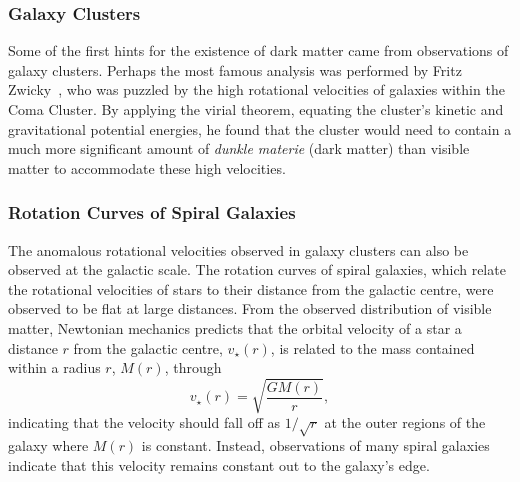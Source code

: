 \subsubsection*{Galaxy Clusters}

Some of the first hints for the existence of dark matter came from observations of galaxy clusters. Perhaps the most famous analysis was performed by Fritz Zwicky~\cite{Zwicky:1937zza_MassesNebulaeClusters}, who was puzzled by the high rotational velocities of galaxies within the Coma Cluster. By applying the virial theorem, equating the cluster's kinetic and gravitational potential energies, he found that the cluster would need to contain a much more significant amount of \textit{dunkle materie} (dark matter) than visible matter to accommodate these high velocities.

\subsubsection*{Rotation Curves of Spiral Galaxies}

The anomalous rotational velocities observed in galaxy clusters can also be observed at the galactic scale. The rotation curves of spiral galaxies, which relate the rotational velocities of stars to their distance from the galactic centre, were observed to be flat at large distances. From the observed distribution of visible matter, Newtonian mechanics predicts that the orbital velocity of a star a distance $r$ from the galactic centre, $v_\star(r)$, is related to the mass contained within a radius $r$, $M(r)$, through
\begin{equation}
    v_\star(r) = \sqrt{\frac{G M(r)}{r}},
\end{equation}
indicating that the velocity should fall off as $1/\sqrt{r}$ at the outer regions of the galaxy where $M(r)$ is constant. Instead, observations of many spiral galaxies indicate that this velocity remains constant out to the galaxy's edge. 

